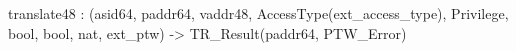translate48 : (asid64, paddr64, vaddr48, AccessType(ext_access_type), Privilege, bool, bool, nat, ext_ptw) -> TR_Result(paddr64, PTW_Error)